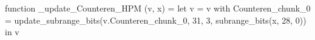 function _update_Counteren_HPM (v, x) = let v = { v with Counteren_chunk_0 = update_subrange_bits(v.Counteren_chunk_0, 31, 3, subrange_bits(x, 28, 0)) } in
  v
